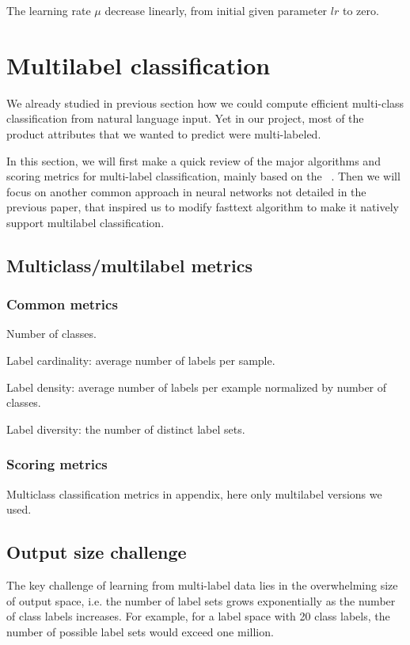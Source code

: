 The learning rate $\mu$ decrease linearly, from initial given parameter $lr$ to zero.




\pagebreak
\section{Multilabel classification}

We already studied in previous section how we could compute efficient multi-class classification from natural language input. Yet in our project, most of the product attributes that we wanted to predict were multi-labeled.

In this section, we will first make a quick review of the major algorithms and scoring metrics for multi-label classification, mainly based on the ~\cite[following paper]{MultilabelReview}. Then we will focus on another common approach in neural networks not detailed in the previous paper, that inspired us to modify fasttext algorithm to make it natively support multilabel classification.


\subsection{Multiclass/multilabel metrics}

\subsubsection{Common metrics}

Number of classes.

Label cardinality: average number of labels per sample.

Label density: average number of labels per example normalized by number of classes.

Label diversity: the number of distinct label sets.

\subsubsection{Scoring metrics}

Multiclass classification metrics in appendix, here only multilabel versions we used.


\subsection{Output size challenge}

The key challenge of learning from multi-label data lies in the overwhelming size of output space, i.e. the number of label sets grows exponentially as the number of class labels increases. For example, for a label space with 20 class labels, the number of possible label sets would exceed one million.

